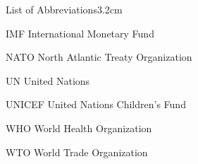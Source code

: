 \begin{mclistof}{List of Abbreviations}{3.2cm}

\item[IMF] International Monetary Fund

\item[NATO] North Atlantic Treaty Organization

\item[UN] United Nations

\item[UNICEF] United Nations Children's Fund

\item[WHO] World Health Organization

\item[WTO] World Trade Organization

\end{mclistof} 
